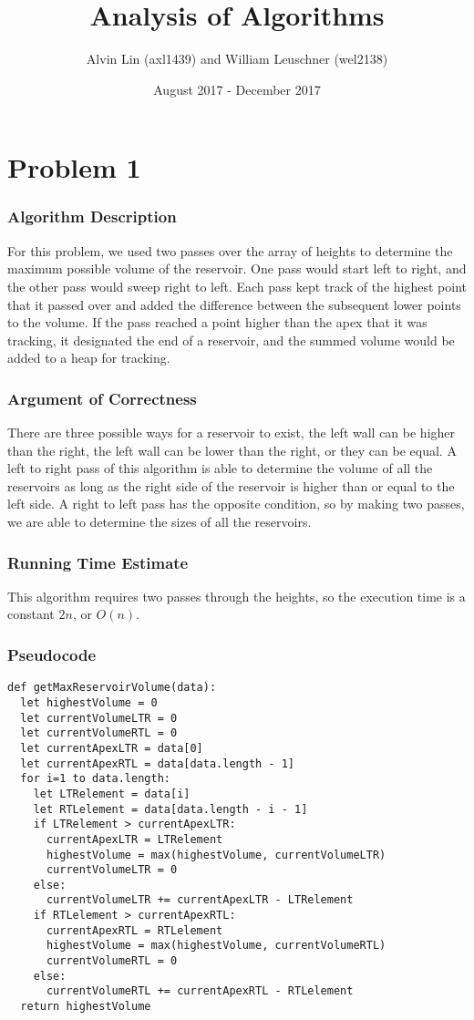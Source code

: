 \documentclass[letterpaper, 12pt]{math}
\title{Analysis of Algorithms}
\author{Alvin Lin (axl1439) and William Leuschner (wel2138)}
\date{August 2017 - December 2017}
\begin{document}
\maketitle

\section*{Problem 1}

\subsubsection*{Algorithm Description}
For this problem, we used two passes over the array of heights to determine
the maximum possible volume of the reservoir. One pass would start left to
right, and the other pass would sweep right to left. Each pass kept track of
the highest point that it passed over and added the difference between the
subsequent lower points to the volume. If the pass reached a point higher than
the apex that it was tracking, it designated the end of a reservoir, and the
summed volume would be added to a heap for tracking.

\subsubsection*{Argument of Correctness}
There are three possible ways for a reservoir to exist, the left wall can be
higher than the right, the left wall can be lower than the right, or they can
be equal. A left to right pass of this algorithm is able to determine the
volume of all the reservoirs as long as the right side of the reservoir is
higher than or equal to the left side. A right to left pass has the opposite
condition, so by making two passes, we are able to determine the sizes of all
the reservoirs.

\subsubsection*{Running Time Estimate}
This algorithm requires two passes through the heights, so the execution time is
a constant \( 2n \), or \( O(n) \).

\subsubsection*{Pseudocode}
\begin{lstlisting}
def getMaxReservoirVolume(data):
  let highestVolume = 0
  let currentVolumeLTR = 0
  let currentVolumeRTL = 0
  let currentApexLTR = data[0]
  let currentApexRTL = data[data.length - 1]
  for i=1 to data.length:
    let LTRelement = data[i]
    let RTLelement = data[data.length - i - 1]
    if LTRelement > currentApexLTR:
      currentApexLTR = LTRelement
      highestVolume = max(highestVolume, currentVolumeLTR)
      currentVolumeLTR = 0
    else:
      currentVolumeLTR += currentApexLTR - LTRelement
    if RTLelement > currentApexRTL:
      currentApexRTL = RTLelement
      highestVolume = max(highestVolume, currentVolumeRTL)
      currentVolumeRTL = 0
    else:
      currentVolumeRTL += currentApexRTL - RTLelement
  return highestVolume
\end{lstlisting}
\end{document}
